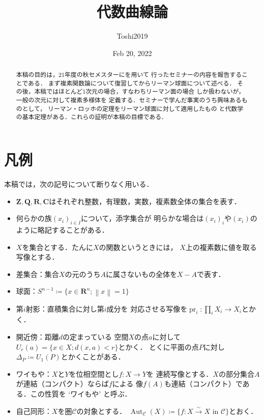 \documentclass[11pt, a4paper, dvipdfmx, draft]{jsarticle}
\theoremstyle{definition}
\newcommand{\zz}{\mathbf{Z}}
\newcommand{\qq}{\mathbf{Q}}
\newcommand{\rr}{\mathbf{R}}
\newcommand{\cc}{\mathbf{C}}
\newcommand{\pr}{\mathop{\mathrm{pr}}\nolimits} %
\newcommand{\mcal}{\mathcal}
\newcommand{\Aut}{\mathop{\mathrm{Aut}}\nolimits}
\newcommand{\isom}{\overset{\sim}{\longrightarrow}}
\theoremstyle{mystyle}
\numberwithin{equation}{section} %
\begin{document}
\title{代数曲線論}
\author{Toshi2019}

\date{Feb 20, 2022}

\maketitle
\begin{abstract}
    本稿の目的は，21年度の秋セメスターに\cite{ogs}を用いて
    行ったセミナーの内容を報告することである．
    まず複素関数論について復習してからリーマン球面について述べる．
    その後，本稿ではほとんど1次元の場合，すなわちリーマン面の場合
    しか扱わないが，一般の次元に対して複素多様体を
    定義する．セミナーで学んだ事実のうち興味あるものとして，
    リーマン・ロッホの定理をリーマン球面に対して適用したもの
    と代数学の基本定理がある．これらの証明が本稿の目標である．
\end{abstract}

\section*{凡例}
本稿では，次の記号について断りなく用いる．
\begin{itemize}
    \item $\zz,\qq,\rr,\cc$はそれぞれ整数，有理数，実数，複素数全体の集合を表す．
    \item 何らかの族$(x_i)_{i\in I}$について，添字集合が
    明らかな場合は$(x_i)_{i}$や$(x_i)$のように略記することがある．
    \item $X$を集合とする．たんに$X$の関数というときには，
    $X$上の複素数に値を取る写像とする．
    \item 差集合：集合$X$の元のうち$A$に属さないもの全体を$X-A$で表す．
    \item 球面：$S^{n-1}\coloneqq \{x\in \rr^{n}; \left\|x\right\|=1\}$
    \item 第$i$射影：直積集合に対し第$i$成分を
    対応させる写像を$\pr_i\colon\prod_{i} X_i\to X_i$とかく．
    \item 開近傍：距離$d$の定まっている
    空間$X$の点$a$に対して$U_r(a)=\{x\in X; d(x,a)<r\}$とかく．
    とくに平面の点$P$に対し$\Delta_P\coloneqq U_1(P)$とかくことがある．
    \item ワイもや：$X$と$Y$を位相空間とし$f\colon X\to Y$を
    連続写像とする．$X$の部分集合$A$が連結（コンパクト）ならば$f$による
    像$f(A)$も連結（コンパクト）である．この性質を `ワイもや' と呼ぶ．
    \item 自己同形：$X$を圏$\mcal{C}$の対象とする．
    $\Aut_{\mcal{C}}(X)\coloneqq
    \{f\colon X \isom X \text{ in } \mcal{C}\}$とおく．
\end{itemize}
\end{document}
